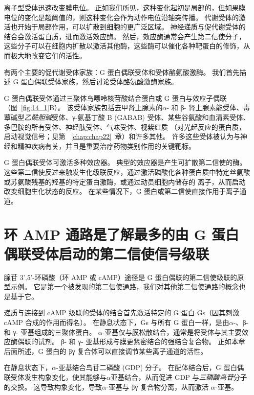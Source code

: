 离子型受体迅速改变膜电位。
正如我们所见，这种变化起初是局部的，但如果膜电位的变化是超阈值的，则这种变化会作为动作电位沿轴突传播。
代谢受体的激活也开始于局部作用，可以扩散到细胞的更广泛区域。
神经递质与促代谢受体的结合会激活蛋白质，进而激活效应酶。
然后，效应酶通常会产生第二信使分子，这些分子可以在细胞内扩散以激活其他酶，这些酶可以催化各种靶蛋白的修饰，从而极大地改变它们的活性。


有两个主要的促代谢受体家族：G 蛋白偶联受体和受体酪氨酸激酶。
我们首先描述 G 蛋白偶联受体家族，然后讨论受体酪氨酸激酶家族。


G 蛋白偶联受体通过三聚体鸟嘌呤核苷酸结合蛋白或 G 蛋白与效应子偶联（图~\ref{fig:14_1}B）。
该受体家族包括去甲肾上腺素的$\alpha$- 和 β- 肾上腺素能受体、毒蕈碱型\textit{乙酰胆碱}受体、γ-氨基丁酸 B (GABAB) 受体、某些谷氨酸和血清素受体、多巴胺的所有受体、神经肽受体、气味受体、视紫红质 （对光起反应的蛋白质，启动视觉信号；见第 ~\ref{chap:chap22}~章）和许多其他。
许多这些受体被认为与神经和精神疾病有关，并且是重要治疗药物类别作用的关键靶标。


G 蛋白偶联受体可激活多种效应器。
典型的效应器是产生可扩散第二信使的酶。
这些第二信使反过来触发生化级联反应，通过激活磷酸化各种蛋白质中特定丝氨酸或苏氨酸残基的羟基的特定蛋白激酶，或通过动员细胞内储存的 离子，从而启动改变细胞生化状态的反应。
在某些情况下，G 蛋白或第二信使直接作用于离子通道。



\section{环 AMP 通路是了解最多的由 G 蛋白偶联受体启动的第二信使信号级联}

腺苷 3',5'-环磷酸（环 AMP 或 cAMP）途径是 G 蛋白偶联的第二信使级联的原型示例。
它是第一个被发现的第二信使通路，我们对其他第二信使通路的概念也是基于它。


递质与连接到 cAMP 级联的受体的结合首先激活特定的 G 蛋白 Gs（因其刺激 cAMP 合成的作用而得名）。
在静息状态下，Gs 与所有 G 蛋白一样，是由$\alpha$-、β- 和 γ- 亚基组成的三聚体蛋白。
$\alpha$-亚基仅与膜松散结合，通常是将受体与其主要效应酶偶联的试剂。
β- 和 γ- 亚基形成与膜更紧密结合的强结合复合物。
正如本章后面所述，G 蛋白的 βγ 复合体可以直接调节某些离子通道的活性。


在静息状态下，$\alpha$-亚基结合鸟苷二磷酸 (GDP) 分子。
在配体结合后，G 蛋白偶联受体发生构象变化，使其能够与$\alpha$亚基结合，从而促进 GDP 与\textit{三磷酸鸟苷}分子的交换。
这导致构象变化，导致$\alpha$-亚基与 βγ 复合物分离，从而激活 $\alpha$-亚基。



